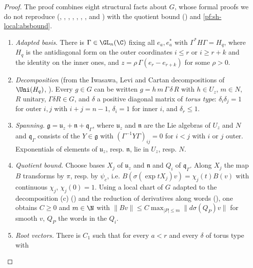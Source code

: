 \begin{proof}
The proof combines eight structural facts about $G$, whose formal proofs we do not reproduce
(, , , , , , , and )
with the quotient bound () and
\cref{pf:sh-local:absbound}.
\begin{enumerate}[label=(\alph*)]
\item \emph{Adapted basis.} There is $\Gamma\in\GL_n(\C)$ fixing all $e_a,e_a^*$ with $\Gamma^*H\Gamma=H_q$, where
$H_q$ is the antidiagonal form on the outer coordinates $i\le r$ or $i\ge r+k$ and the identity on the inner ones,
and $z=\rho\,\Gamma(e_r-e_{r+k})$ for some $\rho>0$.
\item \emph{Decomposition} (from the Iwasawa, Levi and Cartan decompositions of $\Uni(H_q)$,
). Every $g\in G$ can be written
$g=h\,m\,\Gamma\,\delta\,R$ with $h\in U_z$, $m\in N$, $R$ unitary, $\Gamma\delta R\in G$, and $\delta$ a positive
diagonal matrix of \emph{torus type}: $\delta_i\delta_j=1$ for outer $i,j$ with $i+j=n-1$, $\delta_i=1$ for inner
$i$, and $\delta_r\le1$.
\item \emph{Spanning.} $\mathfrak g=\mathfrak u_z+\mathfrak n+\mathfrak q_\Gamma$, where $\mathfrak u_z$ and $\mathfrak n$
are the Lie algebras of $U_z$ and $N$ and $\mathfrak q_\Gamma$ consists of the $Y\in\mathfrak g$ with
$(\Gamma^{-1}Y\Gamma)_{ij}=0$ for $i<j$ with $i$ or $j$ outer. Exponentials of elements of $\mathfrak u_z$, resp.
$\mathfrak n$, lie in $U_z$, resp. $N$.
\item \emph{Quotient bound.} Choose bases $X_j$ of $\mathfrak u_z$ and $\mathfrak n$ and $Q_i$ of $\mathfrak q_\Gamma$.
Along $X_j$ the map $B$ transforms by $\pi$, resp. by $\psi_c$, i.e. $B(\sigma(\exp tX_j)v)=\chi_j(t)B(v)$ with
continuous $\chi_j$, $\chi_j(0)=1$. Using a local chart of $G$ adapted to the decomposition (c)
() and the reduction of derivatives along words
(), one obtains $C\ge0$ and $m\in\N$ with
$\|Bv\|\le C\max_{|P|\le m}\|d\sigma(Q_P)v\|$ for smooth $v$, $Q_P$ the words in the $Q_i$.
\item \emph{Root vectors.} There is $C_1$ such that for every $a<r$ and every $\delta$ of torus type with

\end{enumerate}
\end{proof}
